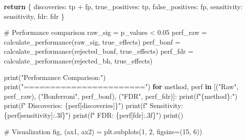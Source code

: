 \documentclass[
  11pt,
  letterpaper,
  oneside]{book}
\newenvironment{Shaded}{\begin{snugshade}}{\end{snugshade}}
\newcommand{\BuiltInTok}[1]{\textcolor[rgb]{0.00,0.23,0.31}{#1}}
\newcommand{\CommentTok}[1]{\textcolor[rgb]{0.37,0.37,0.37}{#1}}
\newcommand{\ControlFlowTok}[1]{\textcolor[rgb]{0.00,0.23,0.31}{\textbf{#1}}}
\newcommand{\DecValTok}[1]{\textcolor[rgb]{0.68,0.00,0.00}{#1}}
\newcommand{\FloatTok}[1]{\textcolor[rgb]{0.68,0.00,0.00}{#1}}
\newcommand{\KeywordTok}[1]{\textcolor[rgb]{0.00,0.23,0.31}{\textbf{#1}}}
\newcommand{\NormalTok}[1]{\textcolor[rgb]{0.00,0.23,0.31}{#1}}
\newcommand{\OperatorTok}[1]{\textcolor[rgb]{0.37,0.37,0.37}{#1}}
\newcommand{\SpecialCharTok}[1]{\textcolor[rgb]{0.37,0.37,0.37}{#1}}
\newcommand{\SpecialStringTok}[1]{\textcolor[rgb]{0.13,0.47,0.30}{#1}}
\newcommand{\StringTok}[1]{\textcolor[rgb]{0.13,0.47,0.30}{#1}}
\begin{document}
\begin{Shaded}
\begin{Highlighting}[]
    \ControlFlowTok{return}\NormalTok{ \{}
        \StringTok{\textquotesingle{}discoveries\textquotesingle{}}\NormalTok{: tp }\OperatorTok{+}\NormalTok{ fp,}
        \StringTok{\textquotesingle{}true\_positives\textquotesingle{}}\NormalTok{: tp,}
        \StringTok{\textquotesingle{}false\_positives\textquotesingle{}}\NormalTok{: fp,}
        \StringTok{\textquotesingle{}sensitivity\textquotesingle{}}\NormalTok{: sensitivity,}
        \StringTok{\textquotesingle{}fdr\textquotesingle{}}\NormalTok{: fdr}
\NormalTok{    \}}

\CommentTok{\# Performance comparison}
\NormalTok{raw\_sig }\OperatorTok{=}\NormalTok{ p\_values }\OperatorTok{\textless{}} \FloatTok{0.05}
\NormalTok{perf\_raw }\OperatorTok{=}\NormalTok{ calculate\_performance(raw\_sig, true\_effects)}
\NormalTok{perf\_bonf }\OperatorTok{=}\NormalTok{ calculate\_performance(rejected\_bonf, true\_effects)}
\NormalTok{perf\_fdr }\OperatorTok{=}\NormalTok{ calculate\_performance(rejected\_bh, true\_effects)}

\BuiltInTok{print}\NormalTok{(}\StringTok{"Performance Comparison:"}\NormalTok{)}
\BuiltInTok{print}\NormalTok{(}\StringTok{"======================="}\NormalTok{)}
\ControlFlowTok{for}\NormalTok{ method, perf }\KeywordTok{in}\NormalTok{ [(}\StringTok{"Raw"}\NormalTok{, perf\_raw), (}\StringTok{"Bonferroni"}\NormalTok{, perf\_bonf), (}\StringTok{"FDR"}\NormalTok{, perf\_fdr)]:}
    \BuiltInTok{print}\NormalTok{(}\SpecialStringTok{f"}\SpecialCharTok{\{}\NormalTok{method}\SpecialCharTok{\}}\SpecialStringTok{:"}\NormalTok{)}
    \BuiltInTok{print}\NormalTok{(}\SpecialStringTok{f"  Discoveries: }\SpecialCharTok{\{}\NormalTok{perf[}\StringTok{\textquotesingle{}discoveries\textquotesingle{}}\NormalTok{]}\SpecialCharTok{\}}\SpecialStringTok{"}\NormalTok{)}
    \BuiltInTok{print}\NormalTok{(}\SpecialStringTok{f"  Sensitivity: }\SpecialCharTok{\{}\NormalTok{perf[}\StringTok{\textquotesingle{}sensitivity\textquotesingle{}}\NormalTok{]}\SpecialCharTok{:.3f\}}\SpecialStringTok{"}\NormalTok{)}
    \BuiltInTok{print}\NormalTok{(}\SpecialStringTok{f"  FDR: }\SpecialCharTok{\{}\NormalTok{perf[}\StringTok{\textquotesingle{}fdr\textquotesingle{}}\NormalTok{]}\SpecialCharTok{:.3f\}}\SpecialStringTok{"}\NormalTok{)}
    \BuiltInTok{print}\NormalTok{()}

\CommentTok{\# Visualization}
\NormalTok{fig, (ax1, ax2) }\OperatorTok{=}\NormalTok{ plt.subplots(}\DecValTok{1}\NormalTok{, }\DecValTok{2}\NormalTok{, figsize}\OperatorTok{=}\NormalTok{(}\DecValTok{15}\NormalTok{, }\DecValTok{6}\NormalTok{))}


\end{Highlighting}
\end{Shaded}
\end{document}
